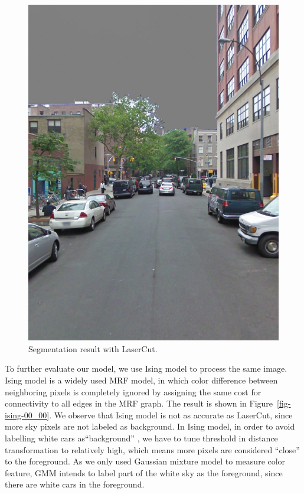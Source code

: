 \documentclass{article} %
\begin{document}
\begin{figure}[h]
\begin{center}
\includegraphics[height=0.5\linewidth]{./fig/overlay_00_00_laser.jpg}
\end{center}
\caption{Segmentation result with LaserCut.}
\label{fig-laser-00_00}
\end{figure}

To further evaluate our model, we use Ising model to process the same
image. Ising model is a widely used MRF model, in which
color difference between neighboring pixels is completely ignored by
assigning the same cost for connectivity to all edges in the MRF
graph. The result is shown in Figure~\ref{fig-ising-00_00}.
We observe that Ising model is not as accurate as LaserCut, since more
sky pixels are not labeled as background.
In Ising model, in order to avoid labelling white cars
as``background'' , we have to tune threshold in distance
transformation to relatively high, which means more pixels are
considered ``close'' to the foreground. As we only used Gaussian
mixture model to measure color feature, GMM intends to
label part of the white sky as the foreground, since there are white cars in
the foreground.
\end{document}
